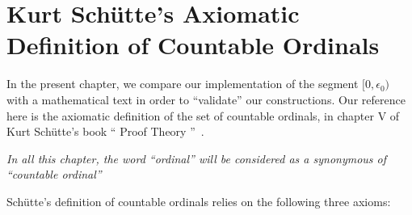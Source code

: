 













\chapter[Countable Ordinals (after Sch\"{u}tte)]{Kurt Schütte's Axiomatic Definition of Countable Ordinals}

\label{chap:schutte} 

In the present chapter, we  compare our implementation of the segment $[0,\epsilon_0)$ with a mathematical text in order to ``validate'' our constructions.
Our reference here is the axiomatic definition of the set of countable ordinals,
in chapter V of Kurt Schütte's book `` Proof Theory ''~\cite{schutte}.

\begin{remark}
\emph{In all this chapter, the word ``ordinal'' will be considered as a synonymous of
``countable ordinal''}  
\end{remark}



Schütte's definition of countable ordinals relies on the following three axioms:

